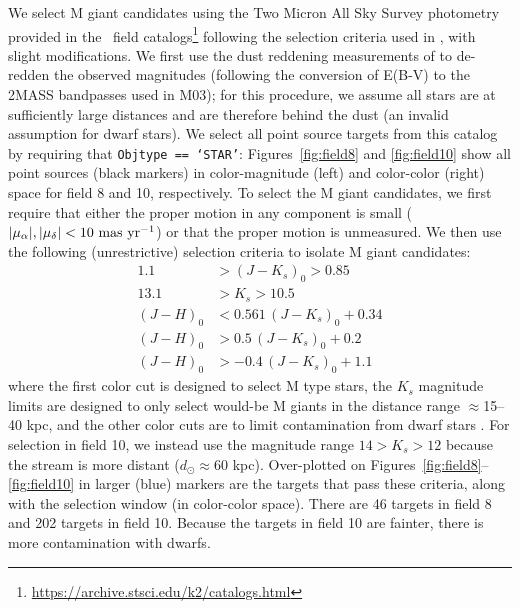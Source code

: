 \documentclass[letterpaper,12pt,preprint]{hack_aastex}
\begin{document}
We select M giant candidates using the Two Micron All Sky Survey \citep[2MASS;
][]{Skrutskie:2006} photometry provided in the \KT\ field
catalogs\footnote{\url{https://archive.stsci.edu/k2/catalogs.html}} following
the selection criteria used in \cite[][hereafter M03]{Majewski:2003}, with
slight modifications. We first use the dust reddening measurements of
\cite{Schlafly:2011} to de-redden the observed magnitudes (following the
conversion of E(B-V) to the 2MASS bandpasses used in M03); for this procedure,
we assume all stars are at sufficiently large distances and are therefore
behind the dust (an invalid assumption for dwarf stars). We select all point
source targets from this catalog by requiring that \texttt{Objtype == `STAR'}:
Figures~\ref{fig:field8} and \ref{fig:field10} show all point sources (black
markers) in color-magnitude (left) and color-color (right) space for field 8
and 10, respectively. To select the M giant candidates, we first require that
either the proper motion in any component is small ($|\mu_\alpha |,|\mu_\delta
| < 10~{\rm mas}~{\rm yr}^{-1}$) or that the proper motion is unmeasured. We
then use the following (unrestrictive) selection criteria to isolate M giant
candidates:
\begin{align} %
	1.1 &> (J-K_s)_0 > 0.85 \\
	13.1 &> K_s > 10.5\\
	(J-H)_0 &< 0.561\,(J-K_s)_0 + 0.34\\
	(J-H)_0 &> 0.5\,(J-K_s)_0 + 0.2\\
	(J-H)_0 &> -0.4\,(J-K_s)_0 + 1.1
\end{align}
where the first color cut is designed to select M type stars, the $K_s$
magnitude limits are designed to only select would-be M giants in the distance
range $\approx$15--40 kpc, and the other color cuts are to limit contamination
from dwarf stars \citep[e.g.,][]{Majewski:2003}. For selection in field 10, we
instead use the magnitude range $14 > K_s > 12$ because the stream is more
distant ($d_\odot \approx 60$ kpc). Over-plotted on
Figures~\ref{fig:field8}--\ref{fig:field10} in larger (blue) markers are the
targets that pass these criteria, along with the selection window (in
color-color space). There are 46 targets in field 8 and 202 targets in field
10. Because the targets in field 10 are fainter, there is more contamination
with dwarfs.

\end{document}
